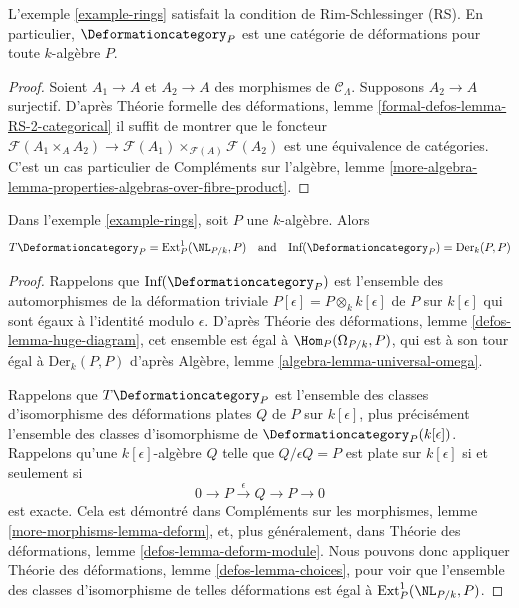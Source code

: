 \begin{lemma}
\label{lemma-rings-RS}
L'exemple \ref{example-rings}
satisfait la condition de Rim-Schlessinger (RS).
En particulier, $\Deformationcategory_P$ est une catégorie de déformations
pour toute $k$-algèbre $P$.
\end{lemma}

\begin{proof}
Soient $A_1 \to A$ et $A_2 \to A$ des morphismes de $\mathcal{C}_\Lambda$.
Supposons $A_2 \to A$ surjectif. D'après Théorie formelle
des déformations, lemme
\ref{formal-defos-lemma-RS-2-categorical}
il suffit de montrer que le foncteur
$\mathcal{F}(A_1 \times_A A_2) \to
\mathcal{F}(A_1) \times_{\mathcal{F}(A)} \mathcal{F}(A_2)$
est une équivalence de catégories.
C'est un cas particulier de Compléments sur l'algèbre, lemme
\ref{more-algebra-lemma-properties-algebras-over-fibre-product}.
\end{proof}

\begin{lemma}
\label{lemma-rings-TI}
Dans l'exemple \ref{example-rings}, soit $P$ une $k$-algèbre. Alors
$$
T\Deformationcategory_P = \text{Ext}^1_P(\NL_{P/k}, P)
\quad\text{and}\quad
\text{Inf}(\Deformationcategory_P) = \text{Der}_k(P, P)
$$
\end{lemma}

\begin{proof}
Rappelons que $\text{Inf}(\Deformationcategory_P)$ est l'ensemble des
automorphismes de la déformation triviale
$P[\epsilon] = P \otimes_k k[\epsilon]$ de $P$ sur $k[\epsilon]$
qui sont égaux à l'identité modulo $\epsilon$.
D'après Théorie des déformations, lemme \ref{defos-lemma-huge-diagram},
cet ensemble est égal à $\Hom_P(\Omega_{P/k}, P)$, qui est à son tour
égal à $\text{Der}_k(P, P)$ d'après
Algèbre, lemme \ref{algebra-lemma-universal-omega}.

\medskip\noindent
Rappelons que $T\Deformationcategory_P$ est l'ensemble des classes d'isomorphisme
des déformations plates $Q$ de $P$ sur $k[\epsilon]$, plus précisément
l'ensemble des classes d'isomorphisme de $\Deformationcategory_P(k[\epsilon])$.
Rappelons qu'une $k[\epsilon]$-algèbre $Q$ telle que $Q/\epsilon Q = P$
est plate sur $k[\epsilon]$ si et seulement si
$$
0 \to P \xrightarrow{\epsilon} Q \to P \to 0
$$
est exacte. Cela est démontré dans Compléments sur les morphismes, lemme
\ref{more-morphisms-lemma-deform}, et, plus généralement, dans
Théorie des déformations, lemme \ref{defos-lemma-deform-module}.
Nous pouvons donc appliquer
Théorie des déformations, lemme \ref{defos-lemma-choices},
pour voir que l'ensemble des classes d'isomorphisme de telles
déformations est égal à $\text{Ext}^1_P(\NL_{P/k}, P)$.
\end{proof}

